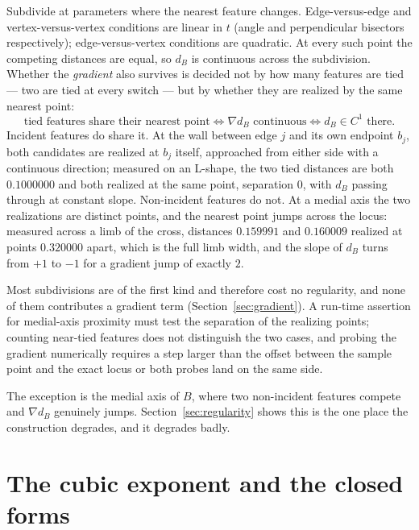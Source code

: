\documentclass[11pt]{article}
\begin{document}
Subdivide at parameters where the nearest feature changes. Edge-versus-edge and vertex-versus-vertex conditions are linear in $t$ (angle and perpendicular bisectors respectively); edge-versus-vertex conditions are quadratic. At every such point the competing distances are equal, so $d_B$ is continuous across the subdivision. Whether the \emph{gradient} also survives is decided not by how many features are tied --- two are tied at every switch --- but by whether they are realized by the same nearest point:
\begin{equation}
\boxed{\;\text{tied features share their nearest point} \iff \nabla d_B \text{ continuous} \iff d_B \in C^1 \text{ there.}\;}
\label{eq:realizing}
\end{equation}
Incident features do share it. At the wall between edge $j$ and its own endpoint $b_j$, both candidates are realized at $b_j$ itself, approached from either side with a continuous direction; measured on an L-shape, the two tied distances are both $0.1000000$ and both realized at the same point, separation $0$, with $d_B$ passing through at constant slope. Non-incident features do not. At a medial axis the two realizations are distinct points, and the nearest point jumps across the locus: measured across a limb of the cross, distances $0.159991$ and $0.160009$ realized at points $0.320000$ apart, which is the full limb width, and the slope of $d_B$ turns from $+1$ to $-1$ for a gradient jump of exactly $2$.

Most subdivisions are of the first kind and therefore cost no regularity, and none of them contributes a gradient term (Section~\ref{sec:gradient}). A run-time assertion for medial-axis proximity must test the separation of the realizing points; counting near-tied features does not distinguish the two cases, and probing the gradient numerically requires a step larger than the offset between the sample point and the exact locus or both probes land on the same side.

The exception is the medial axis of $B$, where two non-incident features compete and $\nabla d_B$ genuinely jumps. Section~\ref{sec:regularity} shows this is the one place the construction degrades, and it degrades badly.

\section{The cubic exponent and the closed forms}
\label{sec:repulsion}
\end{document}
